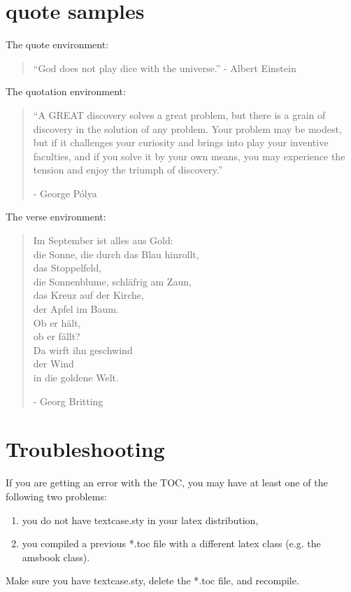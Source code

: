 \documentclass{iuphd}
\begin{document}
\section{quote samples}
The quote environment:
\begin{quote}
``God does not play dice with the universe.'' - Albert Einstein
\end{quote}
The quotation environment:
\begin{quotation}
 ``A GREAT discovery solves a great problem, but there is a grain of discovery in the solution of any problem.
 Your problem may be modest, but if it challenges your curiosity and brings into play your inventive faculties,
 and if you solve it by your own means, you may experience the tension and enjoy the triumph of discovery.''
 
 - George P\'olya
\end{quotation}
The verse environment:
\begin{verse}
Im September ist alles aus Gold:\\ 
die Sonne, die durch das Blau hinrollt,\\
das Stoppelfeld,\\
die Sonnenblume, schläfrig am Zaun,\\
das Kreuz auf der Kirche,\\
der Apfel im Baum.\\
Ob er h\"alt,\\
ob er f\"allt? \\
Da wirft ihn geschwind\\
der Wind\\
in die goldene Welt.

- Georg Britting
\end{verse}

\section{Troubleshooting}

If you are getting an error with the TOC, you may have at least one of the following two problems:
\begin{enumerate}
 \item you do not have textcase.sty in your latex distribution,
 \item you compiled a previous *.toc file with a different latex class (e.g. the amsbook class).
\end{enumerate}
Make sure you have textcase.sty, delete the *.toc file, and recompile.

\begin{comment}
 

\end{comment}
\printbibliography

%
\end{document}

